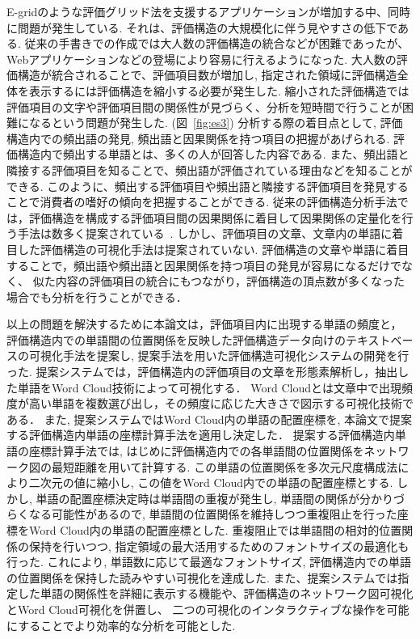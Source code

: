 \documentclass[syuuron]{kuee}
\begin{document}
	E-gridのような評価グリッド法を支援するアプリケーションが増加する中、同時に問題が発生している. 
	それは、評価構造の大規模化に伴う見やすさの低下である. 
	従来の手書きでの作成では大人数の評価構造の統合などが困難であったが、Webアプリケーションなどの登場により容易に行えるようになった. 
	大人数の評価構造が統合されることで、評価項目数が増加し, 指定された領域に評価構造全体を表示するには評価構造を縮小する必要が発生した.  
	縮小された評価構造では評価項目の文字や評価項目間の関係性が見づらく、分析を短時間で行うことが困難になるという問題が発生した. (図~\ref{fig:es3})
	分析する際の着目点として, 評価構造内での頻出語の発見, 頻出語と因果関係を持つ項目の把握があげられる. 
	評価構造内で頻出する単語とは、多くの人が回答した内容である. 
	また、頻出語と隣接する評価項目を知ることで、頻出語が評価されている理由などを知ることができる. 
	このように、頻出する評価項目や頻出語と隣接する評価項目を発見することで消費者の嗜好の傾向を把握することができる. 
	従来の評価構造分析手法では，評価構造を構成する評価項目間の因果関係に着目して因果関係の定量化を行う手法は数多く提案されている~\cite{egm8, egm9}. 
	しかし、評価項目の文章、文章内の単語に着目した評価構造の可視化手法は提案されていない. 
	評価構造の文章や単語に着目することで，頻出語や頻出語と因果関係を持つ項目の発見が容易になるだけでなく、
	似た内容の評価項目の統合にもつながり，評価構造の頂点数が多くなった場合でも分析を行うことができる．
	
	以上の問題を解決するために本論文は，評価項目内に出現する単語の頻度と，
	評価構造内での単語間の位置関係を反映した評価構造データ向けのテキストベースの可視化手法を提案し, 
	提案手法を用いた評価構造可視化システムの開発を行った. 
	提案システムでは，評価構造内の評価項目の文章を形態素解析し，抽出した単語をWord Cloud技術によって可視化する．
	Word Cloudとは文章中で出現頻度が高い単語を複数選び出し，その頻度に応じた大きさで図示する可視化技術である．
	また, 提案システムではWord Cloud内の単語の配置座標を, 本論文で提案する評価構造内単語の座標計算手法を適用し決定した．
	提案する評価構造内単語の座標計算手法では, はじめに評価構造内での各単語間の位置関係をネットワーク図の最短距離を用いて計算する. 
	この単語の位置関係を多次元尺度構成法により二次元の値に縮小し, この値をWord Cloud内での単語の配置座標とする. 
	しかし, 単語の配置座標決定時は単語間の重複が発生し, 単語間の関係が分かりづらくなる可能性があるので, 
	単語間の位置関係を維持しつつ重複阻止を行った座標をWord Cloud内の単語の配置座標とした. 
	重複阻止では単語間の相対的位置関係の保持を行いつつ, 指定領域の最大活用するためのフォントサイズの最適化も行った. 
	これにより, 単語数に応じて最適なフォントサイズ, 評価構造内での単語の位置関係を保持した読みやすい可視化を達成した. 
	また、提案システムでは指定した単語の関係性を詳細に表示する機能や、評価構造のネットワーク図可視化とWord Cloud可視化を併置し、
	二つの可視化のインタラクティブな操作を可能にすることでより効率的な分析を可能とした. 
\end{document}
